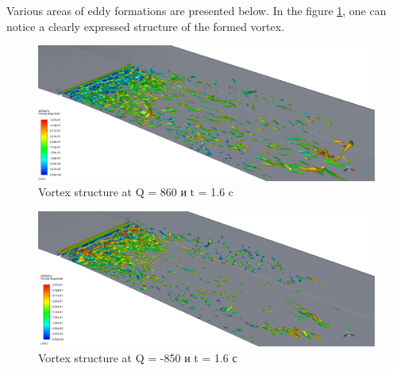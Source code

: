 	Various areas of eddy formations are presented below. In the figure \ref{fig:q860-t16}, one can notice a clearly expressed structure of the formed vortex.
	\begin{figure}[H]
		\centering
		\includegraphics[width=1\linewidth]{../Assets/Q860-t16}
		\caption{Vortex structure at Q = 860 и t = 1.6 c}
		\label{fig:q860-t16}
	\end{figure}
	\begin{figure}[H]
		\centering
		\includegraphics[width=1\linewidth]{../Assets/QM850-t16}
		\caption{Vortex structure at Q = -850 и t = 1.6 с}
		\label{fig:qm850-t16}
	\end{figure}